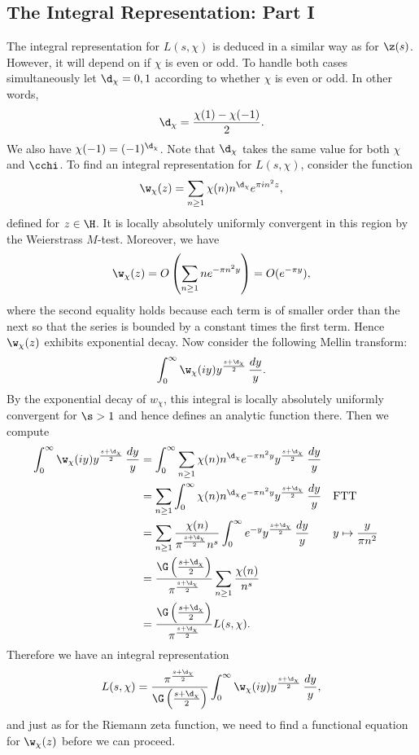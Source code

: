     \subsection*{The Integral Representation: Part I}
      The integral representation for \(L(s,\chi)\) is deduced in a similar way as for \(\z(s)\). However, it will depend on if \(\chi\) is even or odd. To handle both cases simultaneously let \(\d_{\chi} = 0,1\) according to whether \(\chi\) is even or odd. In other words,
      \[
        \d_{\chi} = \frac{\chi(1)-\chi(-1)}{2}.
      \]
      We also have \(\chi(-1) = (-1)^{\d_{\chi}}\). Note that \(\d_{\chi}\) takes the same value for both \(\chi\) and \(\cchi\). To find an integral representation for \(L(s,\chi)\), consider the function
      \[
        \w_{\chi}(z) = \sum_{n \ge 1}\chi(n)n^{\d_{\chi}}e^{\pi in^{2}z},
      \]
      defined for \(z \in \H\). It is locally absolutely uniformly convergent in this region by the Weierstrass \(M\)-test. Moreover, we have
      \[
        \w_{\chi}(z) = O\left(\sum_{n \ge 1}ne^{-\pi n^{2}y}\right) = O(e^{-\pi y}),
      \]
      where the second equality holds because each term is of smaller order than the next so that the series is bounded by a constant times the first term. Hence \(\w_{\chi}(z)\) exhibits exponential decay. Now consider the following Mellin transform:
      \[
        \int_{0}^{\infty}\w_{\chi}(iy)y^{\frac{s+\d_{\chi}}{2}}\,\frac{dy}{y}.
      \]
      By the exponential decay of \(w_{\chi}\), this integral is locally absolutely uniformly convergent for \(\s > 1\) and hence defines an analytic function there. Then we compute
      \begin{align*}
        \int_{0}^{\infty}\w_{\chi}(iy)y^{\frac{s+\d_{\chi}}{2}}\,\frac{dy}{y} &= \int_{0}^{\infty}\sum_{n \ge 1}\chi(n)n^{\d_{\chi}}e^{-\pi n^{2}y}y^{\frac{s+\d_{\chi}}{2}}\,\frac{dy}{y} \\
        &= \sum_{n \ge 1}\int_{0}^{\infty}\chi(n)n^{\d_{\chi}}e^{-\pi n^{2}y}y^{\frac{s+\d_{\chi}}{2}}\,\frac{dy}{y} && \text{FTT} \\
        &= \sum_{n \ge 1}\frac{\chi(n)}{\pi^{\frac{s+\d_{\chi}}{2}}n^{s}}\int_{0}^{\infty}e^{-y}y^{\frac{s+\d_{\chi}}{2}}\,\frac{dy}{y} && \text{\(y \mapsto \frac{y}{\pi n^{2}}\)} \\
        &= \frac{\G\left(\frac{s+\d_{\chi}}{2}\right)}{\pi^{\frac{s+\d_{\chi}}{2}}}\sum_{n \ge 1}\frac{\chi(n)}{n^{s}} \\
        &= \frac{\G\left(\frac{s+\d_{\chi}}{2}\right)}{\pi^{\frac{s+\d_{\chi}}{2}}}L(s,\chi).
      \end{align*}
      Therefore we have an integral representation
      \begin{equation}\label{equ:integral_representation_Dirichlet_L-functions_1}
        L(s,\chi) = \frac{\pi^{\frac{s+\d_{\chi}}{2}}}{\G\left(\frac{s+\d_{\chi}}{2}\right)}\int_{0}^{\infty}\w_{\chi}(iy)y^{\frac{s+\d_{\chi}}{2}}\,\frac{dy}{y},
      \end{equation}
      and just as for the Riemann zeta function, we need to find a functional equation for \(\w_{\chi}(z)\) before we can proceed.
